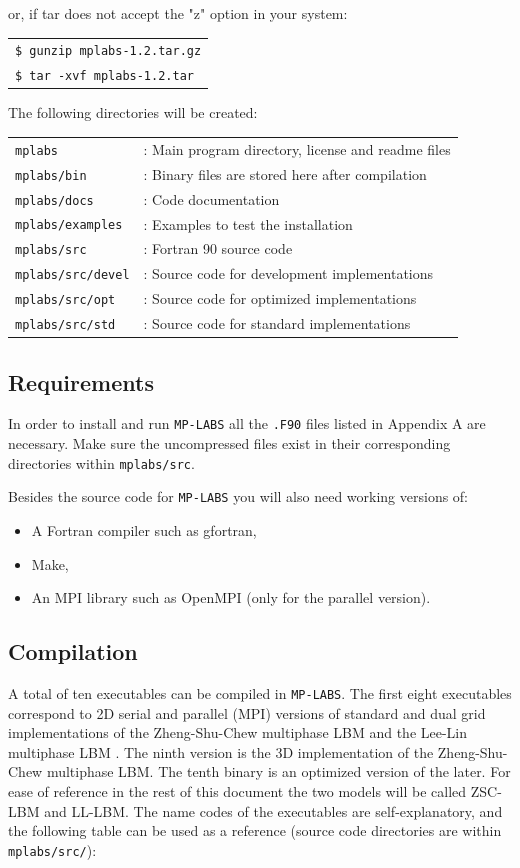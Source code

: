 \documentclass[12pt]{report}
\begin{document}
or, if tar does not accept the "z" option in your system:

\begin{tabular}{l}
\texttt{\$ gunzip mplabs-1.2.tar.gz}\\
\texttt{\$ tar -xvf mplabs-1.2.tar}
\end{tabular}

The following directories will be created:

\begin{tabular}{ll}
\texttt{mplabs}&: Main program directory, license and readme files\\
\texttt{mplabs/bin}&: Binary files are stored here after compilation\\
\texttt{mplabs/docs}&: Code documentation\\
\texttt{mplabs/examples}&: Examples to test the installation\\
\texttt{mplabs/src}&: Fortran 90 source code\\
\texttt{mplabs/src/devel}&: Source code for development implementations\\
\texttt{mplabs/src/opt}&: Source code for optimized implementations\\
\texttt{mplabs/src/std}&: Source code for standard implementations\\
\end{tabular}

\subsection{Requirements}
In order to install and run \verb+MP-LABS+ all the \verb+.F90+ files listed in Appendix A are necessary. Make sure the uncompressed files exist in their corresponding directories within \verb+mplabs/src+.

Besides the source code for \verb+MP-LABS+ you will also need working versions of:

\begin{itemize}
\item A Fortran compiler such as gfortran,
\item Make,
\item An MPI library such as OpenMPI \cite{openmpi} (only for the parallel version).
\end{itemize}

\subsection{Compilation}
\label{sec:compilation}
A total of ten executables can be compiled in \verb+MP-LABS+. The first eight executables correspond to 2D serial and parallel (MPI) versions of standard and dual grid implementations of the Zheng-Shu-Chew multiphase LBM \cite{Zheng2006} and the Lee-Lin multiphase LBM \cite{Lee2005}. The ninth version is the 3D implementation of the Zheng-Shu-Chew multiphase LBM. The tenth binary is an optimized version of the later. For ease of reference in the rest of this document the two models will be called ZSC-LBM and LL-LBM. The name codes of the executables are self-explanatory, and the following table can be used as a reference (source code directories are within \texttt{mplabs/src/}):
\end{document}
